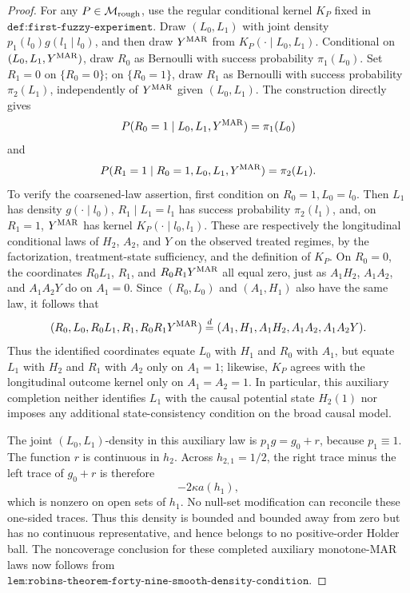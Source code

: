 \documentclass{article}
\begin{document}
\begin{proof}
For any \(P\in\mathcal M_{\rm rough}\), use the regular conditional kernel \(K_P\) fixed in \(\texttt{def:first-fuzzy-experiment}\). Draw \((L_0,L_1)\) with joint density \(p_1(l_0)g(l_1\mid l_0)\), and then draw \(Y^{\rm MAR}\) from \(K_P(\cdot\mid L_0,L_1)\). Conditional on \((L_0,L_1,Y^{\rm MAR})\), draw \(R_0\) as Bernoulli with success probability \(\pi_1(L_0)\). Set \(R_1=0\) on \(\{R_0=0\}\); on \(\{R_0=1\}\), draw \(R_1\) as Bernoulli with success probability \(\pi_2(L_1)\), independently of \(Y^{\rm MAR}\) given \((L_0,L_1)\). The construction directly gives
\[
P(R_0=1\mid L_0,L_1,Y^{\rm MAR})=\pi_1(L_0)
\]
and
\[
P(R_1=1\mid R_0=1,L_0,L_1,Y^{\rm MAR})=\pi_2(L_1).
\]
To verify the coarsened-law assertion, first condition on \(R_0=1,L_0=l_0\). Then \(L_1\) has density \(g(\cdot\mid l_0)\), \(R_1\mid L_1=l_1\) has success probability \(\pi_2(l_1)\), and, on \(R_1=1\), \(Y^{\rm MAR}\) has kernel \(K_P(\cdot\mid l_0,l_1)\). These are respectively the longitudinal conditional laws of \(H_2\), \(A_2\), and \(Y\) on the observed treated regimes, by the factorization, treatment-state sufficiency, and the definition of \(K_P\). On \(R_0=0\), the coordinates \(R_0L_1\), \(R_1\), and \(R_0R_1Y^{\rm MAR}\) all equal zero, just as \(A_1H_2\), \(A_1A_2\), and \(A_1A_2Y\) do on \(A_1=0\). Since \((R_0,L_0)\) and \((A_1,H_1)\) also have the same law, it follows that
\[
(R_0,L_0,R_0L_1,R_1,R_0R_1Y^{\rm MAR})
\overset{d}{=}
(A_1,H_1,A_1H_2,A_1A_2,A_1A_2Y).
\]
Thus the identified coordinates equate \(L_0\) with \(H_1\) and \(R_0\) with \(A_1\), but equate \(L_1\) with \(H_2\) and \(R_1\) with \(A_2\) only on \(A_1=1\); likewise, \(K_P\) agrees with the longitudinal outcome kernel only on \(A_1=A_2=1\). In particular, this auxiliary completion neither identifies \(L_1\) with the causal potential state \(H_2(1)\) nor imposes any additional state-consistency condition on the broad causal model.

The joint \((L_0,L_1)\)-density in this auxiliary law is \(p_1g=g_0+r\), because \(p_1\equiv1\). The function \(r\) is continuous in \(h_2\). Across \(h_{2,1}=1/2\), the right trace minus the left trace of \(g_0+r\) is therefore
\[
-2\kappa a(h_1),
\]
which is nonzero on open sets of \(h_1\). No null-set modification can reconcile these one-sided traces. Thus this density is bounded and bounded away from zero but has no continuous representative, and hence belongs to no positive-order Holder ball. The noncoverage conclusion for these completed auxiliary monotone-MAR laws now follows from \(\texttt{lem:robins-theorem-forty-nine-smooth-density-condition}\).


\end{proof}
\end{document}
